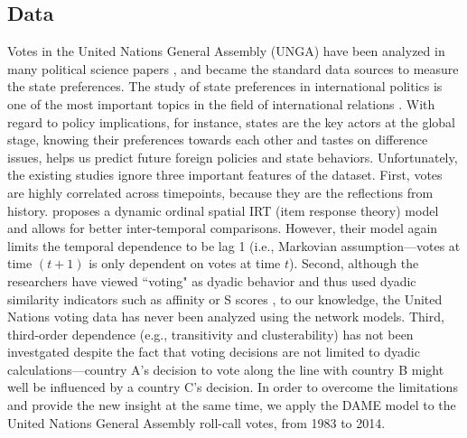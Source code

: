 \documentclass[a4paper]{article}
\begin{document}
\subsection{Data}\label{subsec: data processing}
Votes in the United Nations General Assembly (UNGA) have been analyzed in many political science papers \citep{voeten2000clashes,voeten2004resisting,bearce2007intergovernmental,mattes2015leadership,bailey2017estimating}, and became the standard data sources to measure the state preferences. The study of state preferences in international politics is one of the most important topics in the field of international relations \citep{wendt_1994}. With regard to policy implications, for instance, states are the key actors at the global stage, knowing their preferences towards each other and tastes on difference issues, helps us predict future foreign policies and state behaviors. Unfortunately, the existing studies ignore three important features of the dataset. First, votes are highly correlated across timepoints, because they are the reflections from history. \cite{bailey2017estimating} proposes a dynamic ordinal spatial IRT (item response theory) model and allows for better inter-temporal comparisons. However, their model again limits the temporal dependence to be lag 1 (i.e., Markovian assumption---votes at time $(t+1)$ is only dependent on votes at time $t$). Second, although the researchers have viewed ``voting" as dyadic behavior and thus used dyadic similarity indicators such as affinity or S scores \citep{gartzke1998kant,signorino1999tau}, to our knowledge, the United Nations voting data has never been analyzed using the network models. Third, third-order dependence (e.g., transitivity and clusterability) has not been investgated despite the fact that voting decisions are not limited to dyadic calculations---country A's decision to vote along the line with country B might well be influenced by a country C's decision. In order to overcome the limitations and provide the new insight at the same time, we apply the DAME model to the United Nations General Assembly roll-call votes, from 1983 to 2014.\\ \newline
\end{document}
